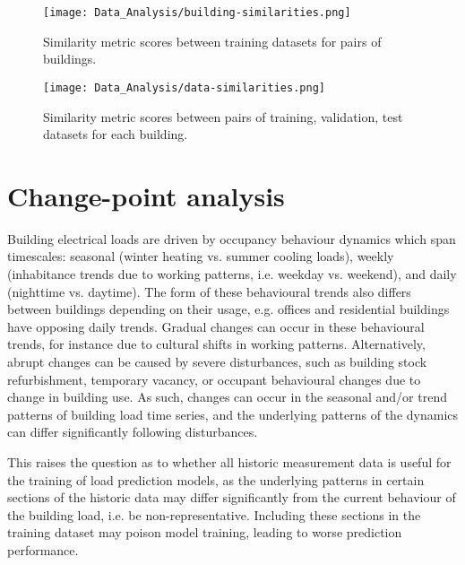 \begin{subappendices}
    \begin{figure}
        \centering
        \texttt{[image: Data\_Analysis/building-similarities.png]}
        \caption{Similarity metric scores between training datasets for pairs of buildings.}
        \label{fig:forecasting-similarities-buildings}
    \end{figure}

    \begin{figure}
        \centering
        \texttt{[image: Data\_Analysis/data-similarities.png]}
        \caption{Similarity metric scores between pairs of training, validation, test datasets for each building.}
        \label{fig:forecasting-similarities-datasets}
    \end{figure}



    \newpage
    \vspace*{0cm} %
    \section{Change-point analysis} \label{app:forecasting-change-points}

    Building electrical loads are driven by occupancy behaviour dynamics which span timescales: seasonal (winter heating vs. summer cooling loads), weekly (inhabitance trends due to working patterns, i.e. weekday vs. weekend), and daily (nighttime vs. daytime). The form of these behavioural trends also differs between buildings depending on their usage, e.g. offices and residential buildings have opposing daily trends. Gradual changes can occur in these behavioural trends, for instance due to cultural shifts in working patterns. Alternatively, abrupt changes can be caused by severe disturbances, such as building stock refurbishment, temporary vacancy, or occupant behavioural changes due to change in building use. As such, changes can occur in the seasonal and/or trend patterns of building load time series, and the underlying patterns of the dynamics can differ significantly following disturbances.

    This raises the question as to whether all historic measurement data is useful for the training of load prediction models, as the underlying patterns in certain sections of the historic data may differ significantly from the current behaviour of the building load, i.e. be non-representative. Including these sections in the training dataset may poison model training, leading to worse prediction performance.


\end{subappendices}
